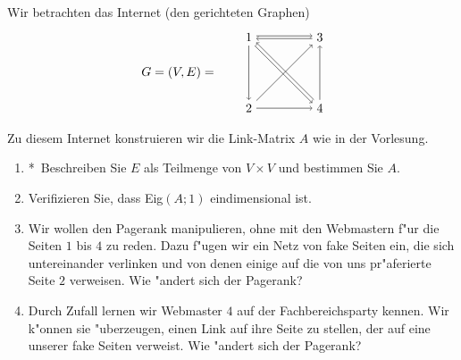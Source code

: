 \documentclass[a4,11pt]{article}
\newcommand{\bonusitem}{\item\hspace*{-2.4mm}*\ }
\begin{document}
\begin{aufgabe}[4 Punkte]
Wir betrachten das Internet (den gerichteten Graphen) %
\[
\begin{tikzpicture}
\node at (-2, 1) {$G = (V, E) = $};

\node (s3) at (2,2) {$3$};
\node (s4) at (2,0) {$4$};
\node (s2) at (0,0) {$2$};
\node (s1) at (0,2) {$1$};

\draw[->] (s1) -- (s2);
\draw[->] (s1.10) -- (s3.170);
\draw[->] (s1.305) -- (s4.145);

\draw[->] (s2) -- (s3);
\draw[->] (s2) -- (s4);

\draw[->] (s3.190) -- (s1.350);

\draw[->] (s4.125) -- (s1.325);
\draw[->] (s4) -- (s3);
\end{tikzpicture}
\]

Zu diesem Internet konstruieren wir die Link-Matrix $A$ wie in der
Vorlesung.

\begin{enumerate} \addtocounter{enumi}{-1}
\bonusitem Beschreiben Sie $E$ als Teilmenge von $V \times V$ und
bestimmen Sie $A$.
\item
Verifizieren Sie, dass Eig$(A;1)$ eindimensional ist.
\item
  \addtocounter{footnote}{1}
  Wir wollen den Pagerank manipulieren, ohne mit den Webmastern f"ur
  die Seiten $1$ bis $4$ zu reden. Dazu f"ugen wir ein Netz von fake
  Seiten ein, die sich untereinander verlinken und von denen einige
  auf die von uns pr"aferierte Seite $2$ verweisen.
  Wie "andert sich der Pagerank?\footnotemark
\item
  \addtocounter{footnote}{-1}
  Durch Zufall lernen wir Webmaster $4$ auf der Fachbereichsparty
  kennen. Wir k"onnen sie "uberzeugen, einen Link auf ihre Seite zu
  stellen, der auf eine unserer fake Seiten verweist. Wie "andert sich
  der Pagerank?\footnotemark
\end{enumerate}
\addtocounter{footnote}{-1}
\addtocounter{footnote}{1}
\end{aufgabe}
\end{document}
